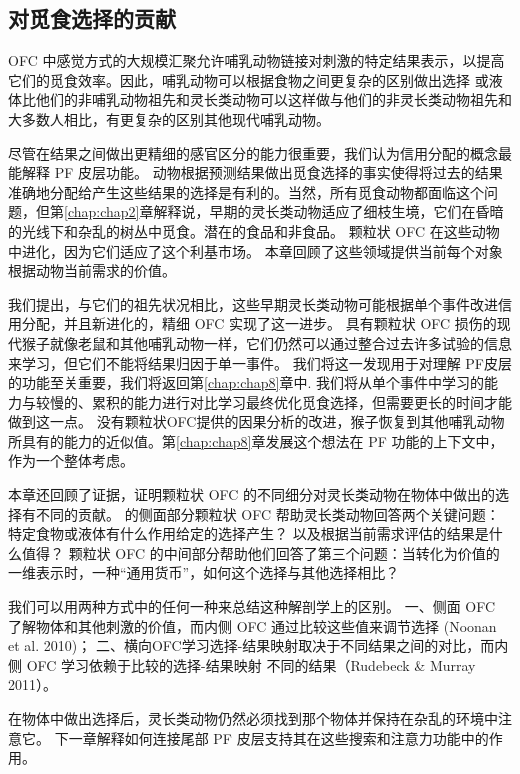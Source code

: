 \subsection{对觅食选择的贡献}
OFC 中感觉方式的大规模汇聚允许哺乳动物链接对刺激的特定结果表示，以提高它们的觅食效率。因此，哺乳动物可以根据食物之间更复杂的区别做出选择
或液体比他们的非哺乳动物祖先和灵长类动物可以这样做与他们的非灵长类动物祖先和大多数人相比，有更复杂的区别其他现代哺乳动物。\par
尽管在结果之间做出更精细的感官区分的能力很重要，我们认为信用分配的概念最能解释 PF 皮层功能。 动物根据预测结果做出觅食选择的事实使得将过去的结果准确地分配给产生这些结果的选择是有利的。当然，所有觅食动物都面临这个问题，但第\ref{chap:chap2}章解释说，早期的灵长类动物适应了细枝生境，它们在昏暗的光线下和杂乱的树丛中觅食。潜在的食品和非食品。 颗粒状 OFC 在这些动物中进化，因为它们适应了这个利基市场。 本章回顾了这些领域提供当前每个对象根据动物当前需求的价值。\par
我们提出，与它们的祖先状况相比，这些早期灵长类动物可能根据单个事件改进信用分配，并且新进化的，精细 OFC 实现了这一进步。 具有颗粒状 OFC 损伤的现代猴子就像老鼠和其他哺乳动物一样，它们仍然可以通过整合过去许多试验的信息来学习，但它们不能将结果归因于单一事件。 我们将这一发现用于对理解 PF皮层的功能至关重要，我们将返回第\ref{chap:chap8}章中. 我们将从单个事件中学习的能力与较慢的、累积的能力进行对比学习最终优化觅食选择，但需要更长的时间才能做到这一点。 没有颗粒状OFC提供的因果分析的改进，猴子恢复到其他哺乳动物所具有的能力的近似值。第\ref{chap:chap8}章发展这个想法在 PF 功能的上下文中，作为一个整体考虑。\par
本章还回顾了证据，证明颗粒状 OFC 的不同细分对灵长类动物在物体中做出的选择有不同的贡献。 的侧面部分颗粒状 OFC 帮助灵长类动物回答两个关键问题：特定食物或液体有什么作用给定的选择产生？ 以及根据当前需求评估的结果是什么值得？ 颗粒状 OFC 的中间部分帮助他们回答了第三个问题：当转化为价值的一维表示时，一种“通用货币”，如何这个选择与其他选择相比？\par
我们可以用两种方式中的任何一种来总结这种解剖学上的区别。 一、侧面
OFC 了解物体和其他刺激的价值，而内侧 OFC 通过比较这些值来调节选择 (Noonan et al. 2010)； 二、横向OFC学习选择-结果映射取决于不同结果之间的对比，而内侧 OFC 学习依赖于比较的选择-结果映射
不同的结果（Rudebeck \& Murray 2011）。\par
在物体中做出选择后，灵长类动物仍然必须找到那个物体并保持在杂乱的环境中注意它。 下一章解释如何连接尾部 PF 皮层支持其在这些搜索和注意力功能中的作用。\par




